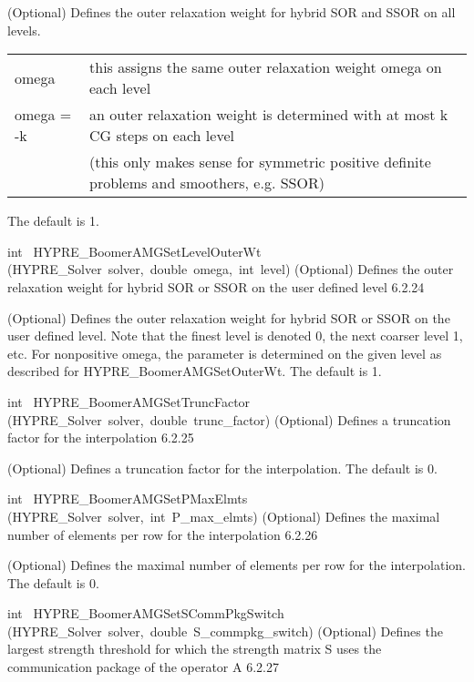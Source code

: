 \documentclass{article}
\begin{document}
\begin{cxxentry}
\begin{cxxentry}
\begin{cxxfunction}
\begin{cxxdoc}
(Optional) Defines the outer relaxation weight for hybrid SOR and SSOR
on all levels.

\begin{tabular}{|l|l|} \hline 
omega \> 0 & this assigns the same outer relaxation weight omega on each level\\
omega = -k & an outer relaxation weight is determined with at most k CG
steps on each level \\
& (this only makes sense for symmetric
positive definite problems and smoothers, e.g. SSOR) \\
\hline
\end{tabular} 

The default is 1.
\end{cxxdoc}
\end{cxxfunction}
\begin{cxxfunction}
{int\ }
        {HYPRE\_BoomerAMGSetLevelOuterWt}
        {(HYPRE\_Solver\ solver,\ double\ omega,\ int\ level)}
        {
(Optional) Defines the outer relaxation weight for hybrid SOR or SSOR
on the user defined level}
        {6.2.24}
\begin{cxxdoc}

(Optional) Defines the outer relaxation weight for hybrid SOR or SSOR
on the user defined level. Note that the finest level is denoted 0, the
next coarser level 1, etc. For nonpositive omega, the parameter is
determined on the given level as described for HYPRE\_BoomerAMGSetOuterWt. 
The default is 1.
\end{cxxdoc}
\end{cxxfunction}
\begin{cxxfunction}
{int\ }
        {HYPRE\_BoomerAMGSetTruncFactor}
        {(HYPRE\_Solver\ solver,\ double\ trunc\_factor)}
        {
(Optional) Defines a truncation factor for the interpolation}
        {6.2.25}
\begin{cxxdoc}

(Optional) Defines a truncation factor for the interpolation.
The default is 0.
\end{cxxdoc}
\end{cxxfunction}
\begin{cxxfunction}
{int\ }
        {HYPRE\_BoomerAMGSetPMaxElmts}
        {(HYPRE\_Solver\ solver,\ int\ P\_max\_elmts)}
        {
(Optional) Defines the maximal number of elements per row for the interpolation}
        {6.2.26}
\begin{cxxdoc}

(Optional) Defines the maximal number of elements per row for the interpolation.
The default is 0.
\end{cxxdoc}
\end{cxxfunction}
\begin{cxxfunction}
{int\ }
        {HYPRE\_BoomerAMGSetSCommPkgSwitch}
        {(HYPRE\_Solver\ solver,\ double\ S\_commpkg\_switch)}
        {
(Optional) Defines the largest strength threshold for which 
the strength matrix S uses the communication package of the operator A}
        {6.2.27}
\begin{cxxdoc}


\end{cxxdoc}
\end{cxxfunction}
\end{cxxentry}
\end{cxxentry}
\end{document}
